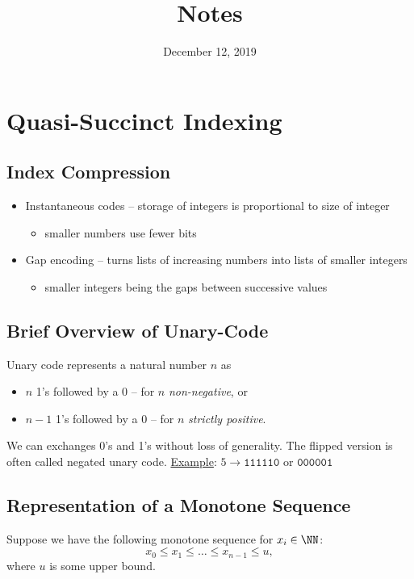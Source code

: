 \documentclass[10pt]{article}
\title{Notes}
\date{December 12, 2019}
\begin{document}
\maketitle

\section{Quasi-Succinct Indexing}\label{quasi-succinct-indexing}
\subsection{Index Compression}\label{index-compression}
\begin{itemize}
\item
    Instantaneous codes -- storage of integers is proportional to size of integer
    \begin{itemize}    
    \item
        smaller numbers use fewer bits
    \end{itemize}
\item
    Gap encoding -- turns lists of increasing numbers into lists of smaller integers
    \begin{itemize}
    \item
        smaller integers being the gaps between successive values
    \end{itemize}
\end{itemize}

\subsection{Brief Overview of Unary-Code}\label{unary-code}
Unary code represents a natural number \(n\) as
\begin{itemize}
\item
    \(n\) 1's followed by a 0 -- for \(n\) \textit{non-negative}, or
\item
    \(n - 1\) 1's followed by a 0 -- for \(n\) \textit{strictly positive}.
\end{itemize}
We can exchanges 0's and 1's without loss of generality.
The flipped version is often called negated unary code.
\underline{Example}: 
\( 5 \rightarrow \texttt{111110} \text{ or } \texttt{000001} \)

\subsection{Representation of a Monotone Sequence}\label{monotone-sequence}
Suppose we have the following monotone sequence for \(x_i \in \NN\):
\[ x_0 \leq x_1 \leq \ldots \leq x_{n-1} \leq u, \]
where \(u\) is some upper bound.
\end{document}
